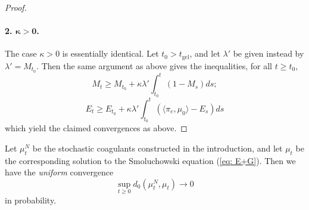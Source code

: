 \begin{proof}
\paragraph{2. $\mathbf{\kappa>0}$.} The case $\kappa>0$ is essentially identical. Let $t_0>t_\text{gel}$,  and let $\lambda'$ be given instead by $\lambda'=M_{t_0}$. Then the same argument as above gives the inequalities, for all $t\ge t_0$, \begin{equation} M_t \ge M_{t_0}+\kappa \lambda'\int_{t_0}^t (1-M_s)ds; \end{equation} \begin{equation}  E_t \ge E_{t_0}+\kappa \lambda'\int_{t_0}^t (\langle \pi_e, \mu_0\rangle-E_s)ds \end{equation} which yield the claimed convergences as above. \end{proof} 
\begin{lemma} \label{lemma: uniform convergence of coagulant} Let $\mu^N_t$ be the stochastic coagulants constructed in the introduction, and let $\mu_t$ be the corresponding solution to the Smoluchowski equation (\ref{eq: E+G}). Then we have the \emph{uniform} convergence \begin{equation} \sup_{t\ge 0} d_0(\mu^N_t, \mu_t) \rightarrow 0\end{equation} in probability.  \end{lemma} 
